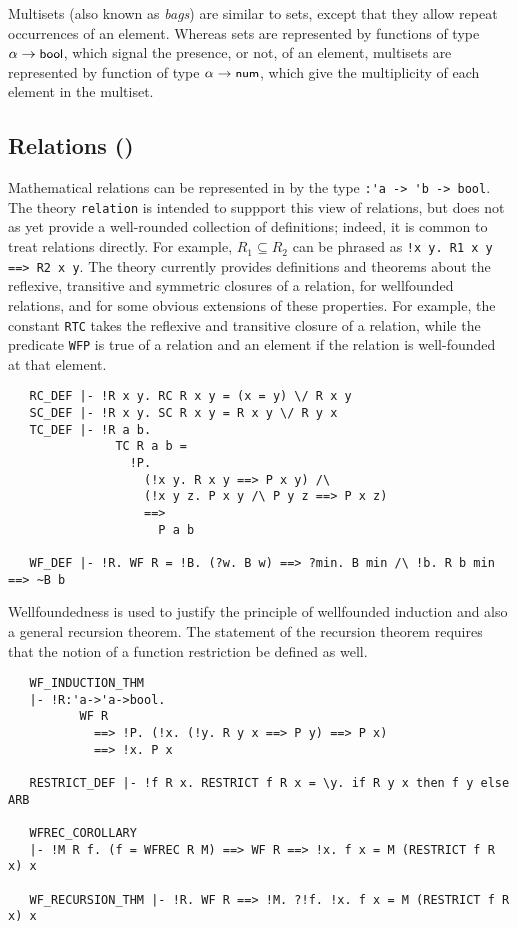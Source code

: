 Multisets (also known as \emph{bags}) are similar to sets, except that
they allow repeat occurrences of an element. Whereas sets are
represented by functions of type $\alpha\to\mbox{\small{\textbf{\sf{bool}}}}$, which signal
the presence, or not, of an element, multisets are represented
by function of type $\alpha\to\mbox{\small{\textbf{\sf{num}}}}$, which give the
multiplicity of each element in the multiset.

\subsection{Relations ()}\label{relation}

Mathematical relations can be represented in \HOL{} by the type
{\small\verb+:'a -> 'b -> bool+}. The theory {\small\verb+relation+}
is intended to suppport this view of relations, but does not as yet
provide a well-rounded collection of definitions; indeed, it is common
to treat relations directly. For example, $R_1 \subseteq R_2$ can be
phrased as {\small\verb+!x y. R1 x y ==> R2 x y+}. The theory
 currently provides definitions and theorems about
the reflexive, transitive and symmetric closures of a relation, for
wellfounded relations, and for some obvious extensions of these
properties.  For example, the constant {\small\verb+RTC+} takes the
reflexive and transitive closure of a relation, while the predicate
{\small\verb+WFP+} is true of a relation and an element if the
relation is well-founded at that element.

\begin{hol}
\begin{verbatim}
   RC_DEF |- !R x y. RC R x y = (x = y) \/ R x y
   SC_DEF |- !R x y. SC R x y = R x y \/ R y x
   TC_DEF |- !R a b.
               TC R a b =
                 !P.
                   (!x y. R x y ==> P x y) /\
                   (!x y z. P x y /\ P y z ==> P x z)
                   ==>
                     P a b

   WF_DEF |- !R. WF R = !B. (?w. B w) ==> ?min. B min /\ !b. R b min ==> ~B b
\end{verbatim}
\end{hol}

Wellfoundedness is used to justify the principle of wellfounded
induction and also a general recursion theorem. The statement of the
recursion theorem requires that the notion of a function restriction be
defined as well.

\begin{hol}
\begin{verbatim}
   WF_INDUCTION_THM
   |- !R:'a->'a->bool.
          WF R
            ==> !P. (!x. (!y. R y x ==> P y) ==> P x)
            ==> !x. P x

   RESTRICT_DEF |- !f R x. RESTRICT f R x = \y. if R y x then f y else ARB

   WFREC_COROLLARY
   |- !M R f. (f = WFREC R M) ==> WF R ==> !x. f x = M (RESTRICT f R x) x

   WF_RECURSION_THM |- !R. WF R ==> !M. ?!f. !x. f x = M (RESTRICT f R x) x
\end{verbatim}
\end{hol}

